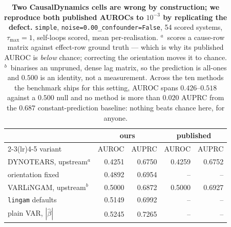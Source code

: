 \begin{table}[t]\centering\footnotesize
\setlength{\tabcolsep}{2.5pt}
\caption{\textbf{Two CausalDynamics cells are wrong by construction; we reproduce both
published AUROCs to $10^{-3}$ by replicating the defect.} \texttt{simple},
\texttt{noise=0.00\_confounder=False}, 54 scored systems, $\tau_{\max}{=}1$,
self-loops scored, mean per-realisation. $^{a}$~scores a cause-row matrix against
effect-row ground truth --- which is why its published AUROC is \emph{below} chance;
correcting the orientation moves it to chance. $^{b}$~binarises an unpruned, dense lag
matrix, so the prediction is all-ones and $0.500$ is an identity, not a measurement. Across the ten methods the
benchmark ships for this setting, AUROC spans $0.426$--$0.518$ against a $0.500$
null and no method is more than $0.020$ AUPRC from the $0.687$
constant-prediction baseline: nothing beats chance here, for anyone.}
\label{tab:dynamics}
\begin{tabular}{@{}lrrrr@{}}
\toprule
 & \multicolumn{2}{c}{ours} & \multicolumn{2}{c}{published} \\
\cmidrule(lr){2-3}\cmidrule(lr){4-5}
variant & AUROC & AUPRC & AUROC & AUPRC \\
\midrule
DYNOTEARS, upstream$^{a}$ & 0.4251 & 0.6750 & 0.4259 & 0.6752 \\
\quad orientation fixed & 0.4892 & 0.6954 & -- & -- \\
VARLiNGAM, upstream$^{b}$ & 0.5000 & 0.6872 & 0.5000 & 0.6927 \\
\quad \texttt{lingam} defaults & 0.5149 & 0.6992 & -- & -- \\
\quad plain VAR, $|\hat\beta|$ & 0.5245 & 0.7265 & -- & -- \\
\bottomrule
\end{tabular}
\end{table}
